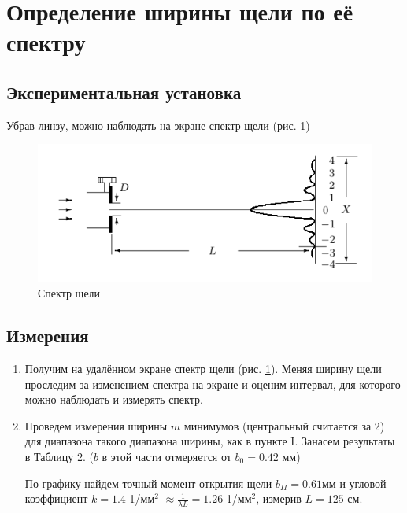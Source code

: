 \documentclass[a4paper,12pt]{article}
\begin{document}
\section*{Определение ширины щели по её спектру}

\subsection*{Экспериментальная установка}

Убрав линзу, можно наблюдать на экране спектр щели (рис. \ref{fig:scheme_II})

\begin{figure}[h]
    \centering
    \includegraphics[width=15cm]{scheme_II.png}
    \caption{Спектр щели}
    \label{fig:scheme_II}
\end{figure}

\newpage

\subsection*{Измерения}

\begin{enumerate}
    \item Получим на удалённом экране спектр щели (рис. \ref{fig:scheme_II}). Меняя ширину щели проследим за изменением спектра на экране и оценим интервал, для которого можно наблюдать и измерять спектр.
    \item Проведем измерения ширины $m$ минимумов (центральный считается за 2) для диапазона такого диапазона ширины, как в пункте I. Занасем результаты в Таблицу 2. ($b$ в этой части отмеряется от $b_0 = 0.42$ мм)
    
   
    
    По графику найдем точный момент открытия щели $b_{II} = 0.61мм$ и угловой коэффициент $k = 1.4$ 1/$\text{мм}^2$ $\approx \frac{1}{\lambda L} = 1.26$ 1/$\text{мм}^2$, измерив $L = 125$ см.
    
\end{enumerate}
\end{document}
